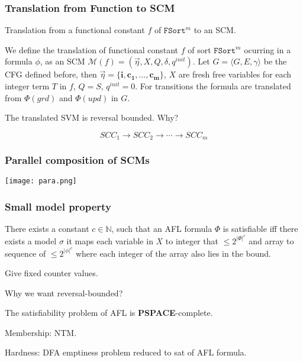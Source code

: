 \documentclass[11pt]{beamer}
\begin{document}
\begin{frame}\frametitle{Translation from Function to SCM}

Translation from a functional constant $f$ of $\texttt{FSort}^m$ to an SCM.

\begin{definition}
We define the translation of functional constant $f$ of sort $\texttt{FSort}^m$ ocurring in a formula $\phi$, as an SCM $\mathcal{M}(f) = (\vec{\eta}, X, Q, \delta, q^{init})$. Let $G = \langle G,E,\gamma\rangle$ be the CFG defined before, then $\vec{\eta} = \{\mathbf{i, c_1, \ldots, c_m}\}$, $X$ are fresh free variables for each integer term $T$ in $f$, $Q = S$, $q^{init} = 0$. For transitions the formula are translated from $\Phi(grd)$ and $\Phi(upd)$ in $G$.

\end{definition}


The translated SVM is reversal bounded. Why?

\[SCC_1 \rightarrow SCC_2 \rightarrow\cdots \rightarrow SCC_m\]

\end{frame}

\begin{frame}\frametitle{
Parallel composition of SCMs}
\begin{center}
\texttt{[image: para.png]}
\end{center}

\end{frame}

\begin{frame}\frametitle{Small model property}
\begin{lemma}
There exists a constant $c\in \mathbb{N}$, such that an AFL formula $\Phi$ is satisfiable iff there exists a model $\sigma$ it maps each variable in $X$ to integer that $\le 2^{|\Phi|^c}$ and array to sequence of $\le 2^{|\phi|^c}$ where each integer of the array also lies in the bound.
\end{lemma}

Give fixed counter values.

Why we want reversal-bounded?

\begin{theorem}
The satisfiability problem of AFL is \textbf{PSPACE}-complete.

\end{theorem}
Membership: NTM.

Hardness: DFA emptiness problem reduced to sat of AFL formula.

\end{frame}
\end{document}
